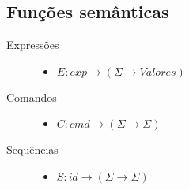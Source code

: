 \documentclass[a4 paper, 12pt]{article}
\begin{document}
\subsection{Fun\c c\~oes sem\^anticas}
\begin{description}
\item[Express\~oes]\hfill
  \begin{itemize}
  \item $E: exp \to (\Sigma \to Valores)$
  \end{itemize}
\item[Comandos]\hfill
  \begin{itemize}
  \item $C: cmd \to (\Sigma \to \Sigma)$
  \end{itemize}
\item[Sequ\^encias]\hfill
  \begin{itemize}
  \item $S: id \to (\Sigma \to \Sigma)$
  \end{itemize}
\end{description}
\end{document}
